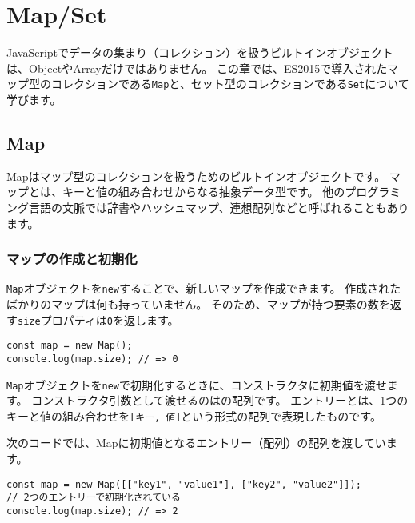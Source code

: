 \hypertarget{map-and-set}{%
\chapter[Map/Set]{Map/Set\,\protect{}}\label{map-and-set}}
\thispagestyle{frontheadings}

JavaScriptでデータの集まり（コレクション）を扱うビルトインオブジェクトは、ObjectやArrayだけではありません。
この章では、ES2015で導入されたマップ型のコレクションである\texttt{Map}と、セット型のコレクションである\texttt{Set}について学びます。

\hypertarget{map}{%
\section{Map}\label{map}}

\href{https://developer.mozilla.org/ja/docs/Web/JavaScript/Reference/Global_Objects/Map}{Map}はマップ型のコレクションを扱うためのビルトインオブジェクトです。
マップとは、キーと値の組み合わせからなる抽象データ型です。
他のプログラミング言語の文脈では辞書やハッシュマップ、連想配列などと呼ばれることもあります。

\hypertarget{map-new}{%
\subsection{マップの作成と初期化}\label{map-new}}

\texttt{Map}オブジェクトを\texttt{new}することで、新しいマップを作成できます。
作成されたばかりのマップは何も持っていません。
そのため、マップが持つ要素の数を返す\texttt{size}プロパティは\texttt{0}を返します。

\begin{lstlisting}
const map = new Map();
console.log(map.size); // => 0
\end{lstlisting}

\texttt{Map}オブジェクトを\texttt{new}で初期化するときに、コンストラクタに初期値を渡せます。
コンストラクタ引数として渡せるのは\textbf{}の配列です。
エントリーとは、1つのキーと値の組み合わせを\texttt{[キー, 値]}という形式の配列で表現したものです。

次のコードでは、Mapに初期値となるエントリー（配列）の配列を渡しています。

\begin{lstlisting}
const map = new Map([["key1", "value1"], ["key2", "value2"]]);
// 2つのエントリーで初期化されている
console.log(map.size); // => 2
\end{lstlisting}

